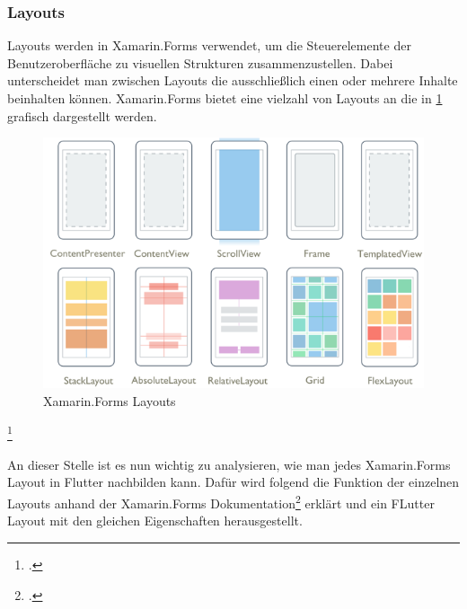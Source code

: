 \begin{minipage}{\linewidth}

\end{minipage}

\subsubsection{Layouts}

Layouts werden in Xamarin.Forms verwendet, um die Steuerelemente der Benutzeroberfläche zu visuellen Strukturen zusammenzustellen.  Dabei unterscheidet man zwischen Layouts die ausschließlich einen oder mehrere Inhalte beinhalten können.  Xamarin.Forms bietet eine vielzahl von Layouts an die in \ref{fig:Xamarin.Forms Layouts} grafisch dargestellt werden.

\begin{figure}[h]
 \includegraphics[width=\textwidth,height=\textheight,keepaspectratio]{Images/CrossPlattformFrameworks/XamarinFormsLayouts.png}
 \caption[Xamarin.Forms Layouts]{Xamarin.Forms Layouts\footnotemark}
 \label{fig:Xamarin.Forms Layouts}
\end{figure}
\footcitetext[Abbildung in Anlehnung an ][Abgerufen am \today]{MicrosoftXamLayouts2018}

An dieser Stelle ist es nun wichtig zu analysieren,  wie man jedes Xamarin.Forms Layout in Flutter nachbilden kann.  Dafür wird folgend die Funktion der einzelnen Layouts anhand der Xamarin.Forms Dokumentation\footcite[Vgl.][Abgerufen am \today]{MicrosoftXamLayouts2018} erklärt und ein FLutter Layout mit den gleichen Eigenschaften herausgestellt. 

